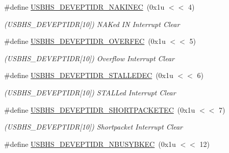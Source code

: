 \begin{DoxyCompactItemize}
\#define \mbox{\hyperlink{group__SAMV71__USBHS_ga421f5227963f7f012335278589732375}{U\+S\+B\+H\+S\+\_\+\+D\+E\+V\+E\+P\+T\+I\+D\+R\+\_\+\+N\+A\+K\+I\+N\+EC}}~(0x1u $<$$<$ 4)
\begin{DoxyCompactList}\small\item\em (U\+S\+B\+H\+S\+\_\+\+D\+E\+V\+E\+P\+T\+I\+DR\mbox{[}10\mbox{]}) N\+A\+Ked IN Interrupt Clear \end{DoxyCompactList}\item 
\mbox{\label{group__SAMV71__USBHS_gabb9709b9f1946dd48901e2a9a7b6ce9f}} 
\#define \mbox{\hyperlink{group__SAMV71__USBHS_gabb9709b9f1946dd48901e2a9a7b6ce9f}{U\+S\+B\+H\+S\+\_\+\+D\+E\+V\+E\+P\+T\+I\+D\+R\+\_\+\+O\+V\+E\+R\+F\+EC}}~(0x1u $<$$<$ 5)
\begin{DoxyCompactList}\small\item\em (U\+S\+B\+H\+S\+\_\+\+D\+E\+V\+E\+P\+T\+I\+DR\mbox{[}10\mbox{]}) Overflow Interrupt Clear \end{DoxyCompactList}\item 
\mbox{\label{group__SAMV71__USBHS_ga5cea648181f2c3156e6032c654e37c3f}} 
\#define \mbox{\hyperlink{group__SAMV71__USBHS_ga5cea648181f2c3156e6032c654e37c3f}{U\+S\+B\+H\+S\+\_\+\+D\+E\+V\+E\+P\+T\+I\+D\+R\+\_\+\+S\+T\+A\+L\+L\+E\+D\+EC}}~(0x1u $<$$<$ 6)
\begin{DoxyCompactList}\small\item\em (U\+S\+B\+H\+S\+\_\+\+D\+E\+V\+E\+P\+T\+I\+DR\mbox{[}10\mbox{]}) S\+T\+A\+L\+Led Interrupt Clear \end{DoxyCompactList}\item 
\mbox{\label{group__SAMV71__USBHS_ga96d9c09a63e83aaddcd44de4b3bf5850}} 
\#define \mbox{\hyperlink{group__SAMV71__USBHS_ga96d9c09a63e83aaddcd44de4b3bf5850}{U\+S\+B\+H\+S\+\_\+\+D\+E\+V\+E\+P\+T\+I\+D\+R\+\_\+\+S\+H\+O\+R\+T\+P\+A\+C\+K\+E\+T\+EC}}~(0x1u $<$$<$ 7)
\begin{DoxyCompactList}\small\item\em (U\+S\+B\+H\+S\+\_\+\+D\+E\+V\+E\+P\+T\+I\+DR\mbox{[}10\mbox{]}) Shortpacket Interrupt Clear \end{DoxyCompactList}\item 
\mbox{\label{group__SAMV71__USBHS_ga4e2f76ccd5459ef8b5cfb351aced0739}} 
\#define \mbox{\hyperlink{group__SAMV71__USBHS_ga4e2f76ccd5459ef8b5cfb351aced0739}{U\+S\+B\+H\+S\+\_\+\+D\+E\+V\+E\+P\+T\+I\+D\+R\+\_\+\+N\+B\+U\+S\+Y\+B\+K\+EC}}~(0x1u $<$$<$ 12)
$$
\end{DoxyCompactItemize}
